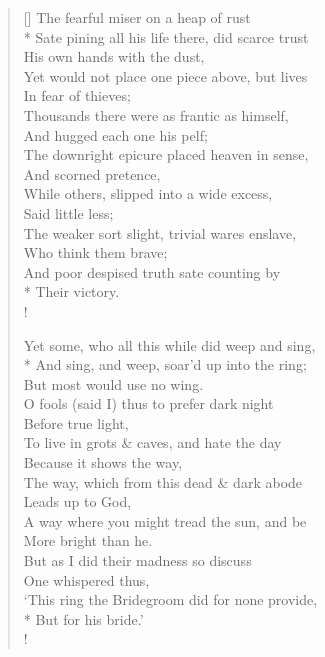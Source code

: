 \documentclass[MAIN]{subfiles}
\begin{document}
\begin{verse}[\versewidth]
The fearful miser on a heap of rust\\*
Sate pining all his life there, did scarce trust\\
\vin His own hands with the dust,\\
Yet would not place one piece above, but lives\\
\vin In fear of thieves;\\
Thousands there were as frantic as himself,\\
\vin And hugged each one his pelf;\\
The downright epicure placed heaven in sense,\\
\vin And scorned pretence,\\
While others, slipped into a wide excess,\\
\vin Said little less;\\
The weaker sort slight, trivial wares enslave,\\
\vin Who think them brave;\\
And poor despised truth sate counting by\\*
\vin Their victory.\\!

Yet some, who all this while did weep and sing,\\*
And sing, and weep, soar'd up into the ring;\\
\vin But most would use no wing.\\
O fools (said I) thus to prefer dark night\\
\vin Before true light,\\
To live in grots \& caves, and hate the day\\
\vin Because it shows the way,\\
The way, which from this dead \& dark abode\\
\vin Leads up to God,\\
A way where you might tread the sun, and be\\
\vin More bright than he.\\
But as I did their madness so discuss\\
\vin One whispered thus,\\
`This ring the Bridegroom did for none provide,\\*
\vin But for his bride.'\\!
\end{verse}
\end{document}
